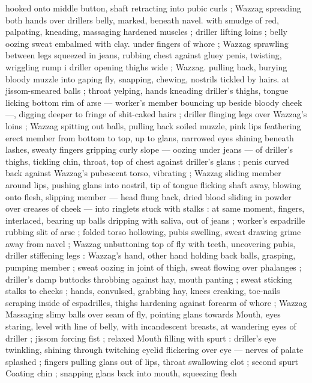 {hooked onto middle button, shaft retracting into pubic curls ; Wazzag 
spreading both hands over drillers belly, marked, beneath navel. 
with smudge of red, palpating, kneading, massaging hardened 
muscles ; driller lifting loins ; belly oozing sweat embalmed with clay. 
under fingers of whore ; Wazzag sprawling between legs squeezed 
in jeans, rubbing chest against gluey penis, twisting, wriggling rump 
i driller opening thighs wide ; Wazzag. pulling back, burying bloody 
muzzle into gaping fly, snapping, chewing, nostrils tickled by hairs. 
at jissom-smeared balls ; throat yelping, hands kneading driller's 
thighs, tongue licking bottom rim of arse --- worker's member 
bouncing up beside bloody cheek ---, digging deeper to fringe of 
shit-caked hairs ; driller flinging legs over Wazzag's loins ; Wazzag 
spitting out balls, pulling back soiled muzzle, pink lips feathering 
erect member from bottom to top, up to glans, narrowed eyes shining 
beneath lashes, sweaty fingers gripping curly slope --- oozing under 
jeans --- of driller's thighs, tickling chin, throat, top of chest against 
driller's glans ; penis curved back against Wazzag's pubescent torso, 
vibrating ; Wazzag sliding member around lips, pushing glans into 
nostril, tip of tongue flicking shaft away, blowing onto flesh, slipping 
member --- head flung back, dried blood sliding in powder over 
creases of cheek --- into ringlets stuck with stalks : at same moment, 
fingers, interlaced, bearing up balls dripping with saliva, out of jeans 
; worker's espadrille rubbing slit of arse ; folded torso hollowing, 
pubis swelling, sweat drawing grime away from navel ; Wazzag 
unbuttoning top of fly with teeth, uncovering pubis, driller stiffening 
legs : Wazzag's hand, other hand holding back balls, grasping, 
pumping member ; sweat oozing in joint of thigh, sweat flowing over 
phalanges ; driller's damp buttocks throbbing against hay, mouth 
panting ; sweat sticking stalks to cheeks ; hands, convulsed, 
grabbing hay, knees creaking, toe-nails scraping inside of 
espadrilles, thighs hardening against forearm of whore ; Wazzag 
Massaging slimy balls over seam of fly, pointing glans towards 
Mouth, eyes staring, level with line of belly, with incandescent 
breasts, at wandering eyes of driller ; jissom forcing fist ; relaxed 
Mouth filling with spurt : driller's eye twinkling, shining through 
twitching eyelid flickering over eye --- nerves of palate splashed ; 
fingers pulling glans out of lips, throat swallowing clot ; second spurt 
Coating chin ; snapping glans back into mouth, squeezing flesh 
}
